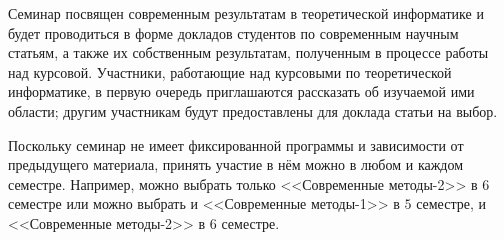 Семинар посвящен современным результатам в теоретической информатике и будет проводиться в форме докладов
студентов по современным научным статьям, а также их собственным результатам, полученным в процессе
работы над курсовой. Участники, работающие над курсовыми по теоретической информатике, в первую очередь
приглашаются рассказать об изучаемой ими области; другим участникам будут предоставлены для доклада
статьи на выбор.

Поскольку семинар не имеет фиксированной программы и зависимости от предыдущего материала, принять
участие в нём можно в любом и каждом семестре. Например, можно выбрать только <<Современные методы-2>> в
$6$ семестре или можно выбрать и <<Современные методы-1>> в $5$ семестре, и <<Современные методы-2>> в
$6$ семестре.

